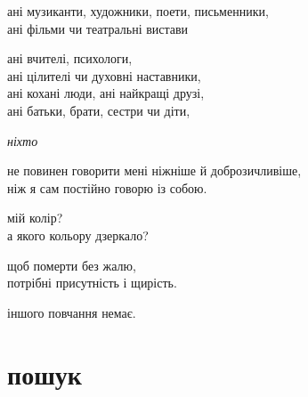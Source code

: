 \documentclass[oneside,12pt]{book}
\begin{document}
\newpage
ані музиканти, художники, поети, письменники,\\
ані фільми чи театральні вистави

ані вчителі, психологи,\\
ані цілителі чи духовні наставники,\\
ані кохані люди, ані найкращі друзі,\\
ані батьки, брати, сестри чи діти,

\emph{ніхто}

не повинен говорити мені ніжніше й доброзичливіше,\\
ніж я сам постійно говорю із собою.

\begin{flushright}
мій колір?\\
а якого кольору дзеркало?
\end{flushright}

щоб померти без жалю,\\
потрібні присутність і щирість.

іншого повчання немає.

\chapter*{пошук}

\vspace*{\fill}

\begin{flushright}

\end{flushright}
\newpage


\vspace*{\fill}

\begin{flushright}

\end{flushright}
\vspace*{\fill}


\vspace*{\fill}

\begin{flushright}

\end{flushright}
\newpage


\vspace*{\fill}

\begin{flushright}

\end{flushright}
\vspace*{\fill}


\end{document}

